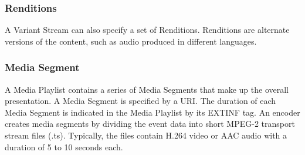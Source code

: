 \subsubsection{Renditions}

A Variant Stream can also specify a set of Renditions. Renditions are alternate versions of the content, such as audio produced in different languages.

\subsubsection{Media Segment}

A Media Playlist contains a series of Media Segments that make up the overall presentation.  A Media Segment is specified by a URI. The duration of each Media Segment is indicated in the Media Playlist by its EXTINF tag. An encoder creates media segments by dividing the event data into short MPEG-2 transport stream files (.ts). Typically, the files contain H.264 video or AAC audio with a duration of 5 to 10 seconds each. 